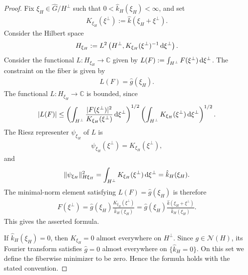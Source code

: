 \documentclass{article}
\renewcommand{\d}{\, \textup{d}}
\newcommand{\C}{\mathbb{C}}
\begin{document}
\begin{appendices}
\begin{proof}
Fix $\xi_H\in\hat G/H^\perp$ such that $0<\hat k_H(\xi_H)<\infty$, and set 
\begin{align*}
    K_{\xi_H}(\xi^\perp)
:=
\hat k(\xi_H+\xi^\perp).
\end{align*}
Consider the Hilbert space
\begin{align*}
    H_{\xi_H}
:=
L^2\left(
H^\perp,
K_{\xi_H}(\xi^\perp)^{-1}\d\xi^\perp
\right).
\end{align*}
Consider the functional $L:H_{\xi_H} \to \C$ given by $L(F) := \int_{H^\perp} F(\xi^\perp) \d \xi^\perp$.
The constraint on the fiber is given by 
\begin{align*}
    L(F)=\hat g(\xi_H).
\end{align*}
The functional $L:H_{\xi_H} \to \C$ is bounded, since 
\begin{align*}
    \vert L(F)|
\leq
\left(
\int_{H^\perp}
\frac{|F(\xi^\perp)|^2}{K_{\xi_H}(\xi^\perp)}
 \d\xi^\perp
\right)^{1/2}
\left(
\int_{H^\perp}
K_{\xi_H}(\xi^\perp) \d\xi^\perp
\right)^{1/2}.
\end{align*}
The Riesz representer $\psi_{\xi_H}$ of $L$ is 
\begin{align*}
    \psi_{\xi_H}(\xi^\perp)=K_{\xi_H}(\xi^\perp),
\end{align*} 
and 
\begin{align*}
    \Vert \psi_{\xi_H}\Vert_{H{\xi_H}}^2
=
\int_{H^\perp}
K_{\xi_H}(\xi^\perp)\d\xi^\perp
=
\hat k_H(\xi_H).
\end{align*}
The minimal-norm element satisfying $L(F)=\widehat g(\xi_H)$ is therefore 
\begin{align*}
  F(\xi^\perp)
=
\hat g(\xi_H)
\frac{K_{\xi_H}(\xi^\perp)}
{\hat k_H(\xi_H)}
=
\hat g(\xi_H)
\frac{\hat k(\xi_H+\xi^\perp)}
{\hat k_H(\xi_H)} .
\end{align*}
This gives the asserted formula.

If $\hat k_H(\xi_H)=0$, then $K_{\xi_H}=0$ almost everywhere on $H^\perp$. Since $g\in\mathcal N(H)$, its Fourier transform satisfies $\hat g=0$ almost everywhere on $\{\hat k_H=0\}$. On this set we define the fiberwise minimizer to be zero. Hence the formula holds with the stated convention.
\end{proof}
\end{appendices}
\end{document}
